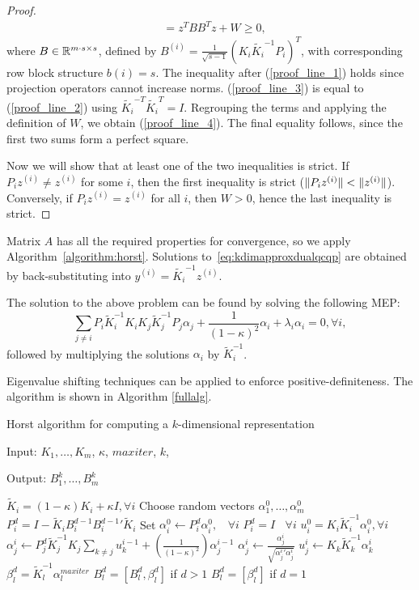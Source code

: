 \begin{proof}
\begin{align}
%
&= z^T B B^T z + W \geq 0\nonumber,
\end{align}
where $B \in \mathbb{R}^{m\cdot s \times s}$, defined by $B^{(i)} = \frac{1}{\sqrt{s-1}}(K_i \widetilde{K_i}^{-1}P_i)^T$, 
with corresponding row block structure $b\left(i\right) = s$. The inequality after (\ref{proof_line_1}) holds 
since projection operators cannot increase norms.
(\ref{proof_line_3}) is equal to (\ref{proof_line_2}) using $\widetilde{K_i}^{-T}  \widetilde{K_i}^T = I$.
Regrouping the terms and applying the definition of $W$, we obtain (\ref{proof_line_4}).
The final equality follows, since the first two sums form a perfect square.

Now we will show that at least one of the two inequalities is strict. 
If $P_i z^{(i)} \neq z^{(i)}$ for some $i$, then the first inequality is 
strict ($\lVert P_i z^{(i)}\rVert < \lVert z^{(i)}\rVert$). Conversely, if $P_i z^{(i)} = z^{(i)}$ 
for all $i$, then $W > 0$, hence the last inequality is strict.%
\end{proof}

Matrix $A$ has all the required properties for convergence, so we
apply Algorithm~\ref{algorithm:horst}. Solutions to~\eqref{eq:kdimapproxdualqcqp} 
are obtained by back-substituting into $y^{(i)} = \widetilde{K_i}^{-1} z^{(i)}$.

The solution to the above problem can be found by solving the following MEP:
$$\sum_{j \neq i}P_i \tilde{K}_i^{-1} K_i K_j\tilde{K}_j^{-1} P_j
\alpha_j + \frac{1}{(1-\kappa)^2}\alpha_i +  \lambda_i \alpha_i = 0,
\forall i,$$
followed by multiplying the solutions $\alpha_i$ by $\tilde{K}_i^{-1}$.

Eigenvalue shifting techniques can be applied to enforce positive-definiteness.
The algorithm is shown in Algorithm \ref{fullalg}.


\begin{algorithm}
\caption{Horst algorithm for computing a $k$-dimensional representation}
Input: $K_1, \ldots, K_m$, $\kappa$, $maxiter$, $k$, \par
Output: $B_1^k, \ldots, B_m^k$
\begin{algorithmic}
\label{fullalg}
\STATE $\tilde{K}_i = (1-\kappa) K_i +  \kappa I, \forall i$
\STATE Choose random vectors $\alpha_1^0, \ldots, \alpha_m^0$
\STATE $P_i^d =I -  \tilde{K}_i B_i^{d-1} {B_i^{d-1}}' \tilde{K}_i$
\STATE Set $\alpha_i^0 \leftarrow P_i^d \alpha_i^0,~~~~ \forall i$
\ELSE
\STATE  $P_i^d = I ~~~~ \forall i$
\ENDIF
\STATE $u_i^0 = K_i \tilde{K}_i^{-1} \alpha_i^0, \forall i$
\STATE $\alpha_j^{i} \leftarrow  P_j^d \tilde{K}_j^{-1} K_j \sum_{k\neq j}  u_k^{i-1}  + \left(\frac{1}{(1-\kappa)^2} \right) \alpha_j^{i-1}$
\STATE $\alpha_j^{i} \leftarrow \frac{\alpha_j^{i}}{\sqrt{{\alpha_j^i}' \alpha_j^i}}$
\STATE $u_j^{i} \leftarrow  K_k  \tilde{K}_k^{-1}  \alpha_k^{i}$
\ENDFOR
\ENDFOR
{}
\STATE $\beta_l^d = \tilde{K}_l^{-1} \alpha_l^{maxiter}$
\STATE $B_l^{d} = [ B_l^d , \beta_l^d]$ if $d > 1$
\STATE $B_l^{d} = [ \beta_l^d]$ if $d = 1$
\ENDFOR
\ENDFOR
\end{algorithmic}
\end{algorithm}


